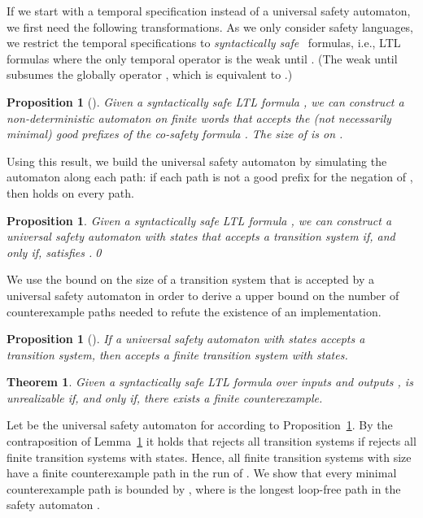\documentclass{LMCS}
\theoremstyle{plain}\newtheorem{theorem}[thm]{Theorem}
\theoremstyle{plain}\newtheorem{lemma}[thm]{Lemma}
\theoremstyle{plain}\newtheorem{proposition}[thm]{Proposition}
\theoremstyle{plain}\newtheorem{corollary}[thm]{Corollary}
\theoremstyle{definition}\newtheorem{definition}{Definition}[section]
\begin{document}
If we start with a temporal specification instead of a universal safety automaton, we first need the following transformations.
As we only consider safety languages, we restrict the temporal specifications to \emph{syntactically safe}~\cite{DBLP:journals/fac/Sistla94} formulas, i.e., LTL formulas where the only temporal operator is the weak until . (The weak until subsumes the globally operator , which is equivalent to .)
\begin{proposition}[\hspace{-0.3pt}\cite{DBLP:journals/fmsd/KupfermanV01}]
  Given a syntactically safe LTL formula , we can construct a non-deterministic automaton  on finite words that accepts the (not necessarily minimal) good prefixes of the co-safety formula .
  The size of  is on .
\end{proposition}\noindent
Using this result, we build the universal safety automaton  by simulating the automaton  along each path: if each path is not a good prefix for the negation of , then  holds on every path.
\begin{proposition} \label{thm:universal-safety-automaton-for-safety-ltl}
  Given a syntactically safe LTL formula , we can construct a universal safety automaton  with  states that accepts a transition system  if, and only if,  satisfies .\qed
\end{proposition}\noindent
We use the bound on the size of a transition system that is accepted by a universal safety automaton  in order to derive a upper bound on the number of counterexample paths needed to refute the existence of an implementation.
\begin{proposition}[\hspace{-0.3pt}\cite{journals/sttt/FinkbeinerS13}] \label{thm:safety-automaton-finite-transition-system}
If a universal safety automaton  with  states accepts a transition system, then  accepts a finite transition system  with  states.
\end{proposition}

\begin{theorem} \label{thm:completeness_full_informed_synthesis}
  Given a syntactically safe LTL formula  over inputs  and outputs ,  is unrealizable if, and only if, there exists a finite counterexample.
\end{theorem}
\proof
  Let  be the universal safety automaton for 
  according to Proposition~\ref{thm:universal-safety-automaton-for-safety-ltl}.
  By the contraposition of Lemma~\ref{thm:safety-automaton-finite-transition-system} it holds that  rejects all transition systems if  rejects all finite transition systems with  states.
  Hence, all finite transition systems with size  have a finite counterexample path in the run of .
  We show that every minimal counterexample path is bounded by , where  is the longest loop-free path in the safety automaton .
  
\end{document}
